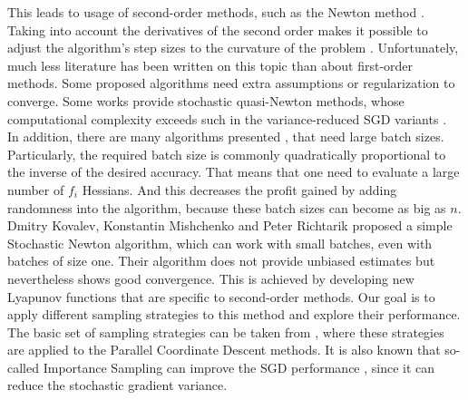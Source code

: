 \documentclass{article}
\begin{document}
	This leads to usage of second-order methods, such as the Newton method \cite{Nesterov-introductory, Newton-convergence, RSN}. Taking into account the derivatives of the second order makes it possible to adjust the algorithm's step sizes to the curvature of the problem \cite{Nesterov-introductory}. Unfortunately, much less literature has been written on this topic than about first-order methods. Some proposed algorithms need extra assumptions \cite{Newton-convergence, RSN} or regularization \cite{cubic-regularization, randomized-cubic, uniform-convex-cubic} to converge. Some works \cite{proximal-quasi, lbfgs, stoch-bfgs} provide stochastic quasi-Newton methods, whose computational complexity exceeds such in the variance-reduced SGD variants \cite{advances-NIPS}. \\
	
	In addition, there are many algorithms presented \cite{sub-sampled, exact-inexact, variance-reduced-Newton, zhang2022adaptive, tripuraneni2018stochastic, zhou2020stochastic}, that need large batch sizes. Particularly, the required batch size is commonly quadratically proportional to the inverse of the desired accuracy. That means that one need to evaluate a large number of $f_i$ Hessians. And this decreases the profit gained by adding randomness into the algorithm, because these batch sizes can become as big as $n$. \\
	
	Dmitry Kovalev, Konstantin Mishchenko and Peter Richtarik proposed \cite{kovalev2019stochastic} a simple Stochastic Newton algorithm, which can work with small batches, even with batches of size one. Their algorithm does not provide unbiased estimates but nevertheless shows good convergence. This is achieved by developing new Lyapunov functions that are specific to second-order methods. Our goal is to apply different sampling strategies to this method and explore their performance. \\
	
	The basic set of sampling strategies can be taken from \cite{richtarik2016parallel}, where these strategies are applied to the Parallel Coordinate Descent methods. It is also known that so-called Importance Sampling can improve the SGD performance \cite{https://doi.org/10.48550/arxiv.1401.2753, 9413313}, since it can reduce the stochastic gradient variance. \\
	
	
	
\renewcommand\refname{References}	


\end{document}

